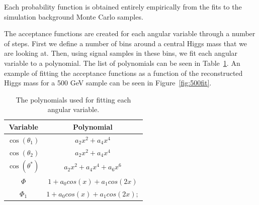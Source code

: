 Each probability function is obtained entirely empirically from the fits to the simulation background Monte Carlo samples.

The acceptance functions are created for each angular variable through a number of steps.  First we define a number of bins around a central Higgs mass that we are looking at.  Then, using signal samples in these bins, we fit each angular variable to a polynomial.  The list of polynomials can be seen in Table~\ref{tab:poly}.  An example of fitting the acceptance functions as a function of the reconstructed Higgs mass for a 500 GeV sample can be seen in Figure~\ref{fig:500fit}.
\begin{center}
\begin{table}[htb]
\caption{%
  \small The polynomials used for fitting each angular variable.%
}
\begin{center}
\begin{tabular}{ c c }
Variable  & Polynomial \\ \hline
$\cos(\theta_1)$ & $a_2 x^2+a_4 x^4$ \\
$\cos(\theta_2)$ & $a_2 x^2+a_4 x^4$ \\
$\cos(\theta^*)$ & $a_2 x^2+a_4 x^4+a_6 x^6$\\
$\Phi$ &   $1 + a_0 cos(x) + a_1 cos(2x)$\\
$\Phi_1$ & $1 + a_0 cos(x) + a_1 cos(2x);$ \\
\end{tabular}
\end{center}
\label{tab:poly}
\end{table}
\end{center}
